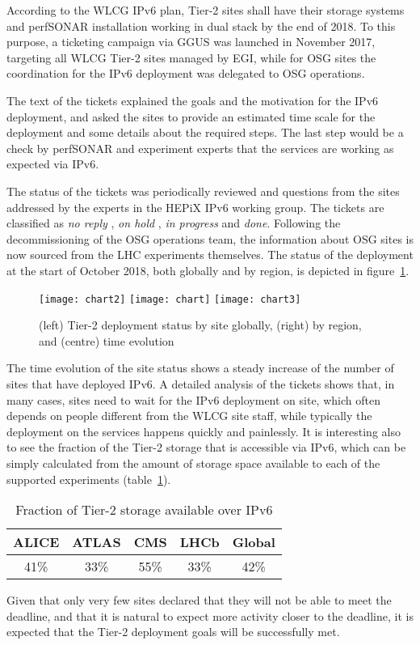 According to the WLCG IPv6 plan, Tier-2 sites shall have
their storage systems and perfSONAR installation
working in dual stack by the end of 2018. To this purpose, a ticketing
campaign via GGUS was launched in November 2017, targeting all WLCG Tier-2
sites managed by EGI, while for OSG sites the coordination for the
IPv6 deployment was delegated to OSG operations.

The text of the tickets explained the goals and the motivation for the
IPv6 deployment, and asked the sites to provide an estimated time
scale for the deployment and some details about the required
steps. The last step would be a check by perfSONAR and experiment
experts that the services are working as expected via IPv6.

The status of the tickets was periodically reviewed and questions from
the sites addressed by the experts in the HEPiX IPv6 working
group. The tickets are classified as {\it no reply} 
, {\it on hold} 
, {\it in progress} 
and {\it done}.
Following the decommissioning of the OSG operations team, the
information about OSG sites is now sourced from the LHC experiments
themselves. The status of the deployment at the start of October 2018, both globally and by
region, is depicted in figure~\ref{fig:t2depl}.
\begin{figure}[t]
\centering
\texttt{[image: chart2]}
\texttt{[image: chart]}
\texttt{[image: chart3]}
\caption{(left) Tier-2 deployment status by site globally, (right) by region, and (centre) time evolution}
\label{fig:t2depl}
\end{figure}

The time evolution of the site status shows a steady increase of the
number of sites that have deployed IPv6. A detailed analysis of the
tickets shows that, in many cases, sites need to wait for the IPv6
deployment on site, which often depends on people different from the
WLCG site staff, while typically the deployment on the services
happens quickly and painlessly. It is interesting also to see the
fraction of the Tier-2 storage that is accessible via IPv6, which can
be simply calculated from the amount of storage space available to
each of the supported experiments (table~\ref{tab:t2stor}).
\begin{table}[h]
\centering
\caption{Fraction of Tier-2 storage available over IPv6}
\label{tab:t2stor}
\begin{tabular}{ccccc}
\hline
ALICE & ATLAS & CMS & LHCb & Global \\\hline
41\% & 33\% & 55\% & 33\% & 42\% \\\hline
\end{tabular}
\end{table}
Given that only very few sites declared that they will not be able to
meet the deadline, and that it is natural to expect more activity closer to
the deadline, it is expected that the Tier-2 deployment
goals will be successfully met.
